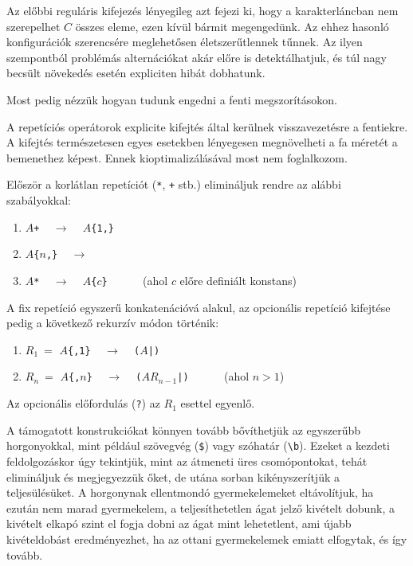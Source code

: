 \documentclass[
    parspace,
    noindent,
    nohyp,
]{elteiktdk}[2023/04/10]
\begin{document}
Az előbbi reguláris kifejezés lényegileg azt fejezi ki,
hogy a karakterláncban nem szerepelhet $C$ összes eleme, ezen kívül bármit megengedünk.
Az ehhez hasonló konfigurációk szerencsére meglehetősen életszerűtlennek tűnnek.
Az ilyen szempontból problémás alternációkat akár előre is detektálhatjuk,
és túl nagy becsült növekedés esetén expliciten hibát dobhatunk.

Most pedig nézzük hogyan tudunk engedni a fenti megszorításokon.

A repetíciós operátorok explicite kifejtés által kerülnek visszavezetésre a fentiekre.
A kifejtés természetesen egyes esetekben lényegesen megnövelheti a fa méretét a bemenethez képest.
Ennek kioptimalizálásával most nem foglalkozom.

Először a korlátlan repetíciót (\texttt{*}, \texttt{+} stb.) elimináljuk rendre az alábbi szabályokkal:

\begin{enumerate}
    \item \texttt{$A$+} ~ $\longrightarrow$ ~ \texttt{$A$\{1,\}}
    \item \texttt{$A$\{$n$,\}} ~ $\longrightarrow$ ~ 
    \item \texttt{$A$*} ~ $\longrightarrow$ ~ \texttt{$A$\{$c$\}} ~~~~~ (ahol $c$ előre definiált konstans)
\end{enumerate}

A fix repetíció egyszerű konkatenációvá alakul,
az opcionális repetíció kifejtése pedig a következő rekurzív módon történik:

\begin{enumerate}
    \item $R_1~=$ \texttt{$A$\{,1\}} ~ $\longrightarrow$ ~ \texttt{($A$|)}
    \item $R_n~=$ \texttt{$A$\{,$n$\}} ~ $\longrightarrow$ ~ \texttt{($AR_{n-1}$|)} ~~~~~ (ahol $n>1$)
\end{enumerate}

Az opcionális előfordulás (\texttt{?}) az $R_1$ esettel egyenlő.

A támogatott konstrukciókat könnyen tovább bővíthetjük az egyszerűbb horgonyokkal,
mint például szövegvég (\texttt{\$}) vagy szóhatár (\texttt{{\textbackslash}b}).
Ezeket a kezdeti feldolgozáskor úgy tekintjük,
mint az átmeneti üres csomópontokat, tehát elimináljuk és megjegyezzük őket,
de utána sorban kikényszerítjük a teljesülésüket.
A horgonynak ellentmondó gyermekelemeket eltávolítjuk,
ha ezután nem marad gyermekelem, a teljesíthetetlen ágat jelző kivételt dobunk,
a kivételt elkapó szint el fogja dobni az ágat mint lehetetlent,
ami újabb kivételdobást eredményezhet, ha az ottani gyermekelemek emiatt elfogytak,
és így tovább.
\end{document}
